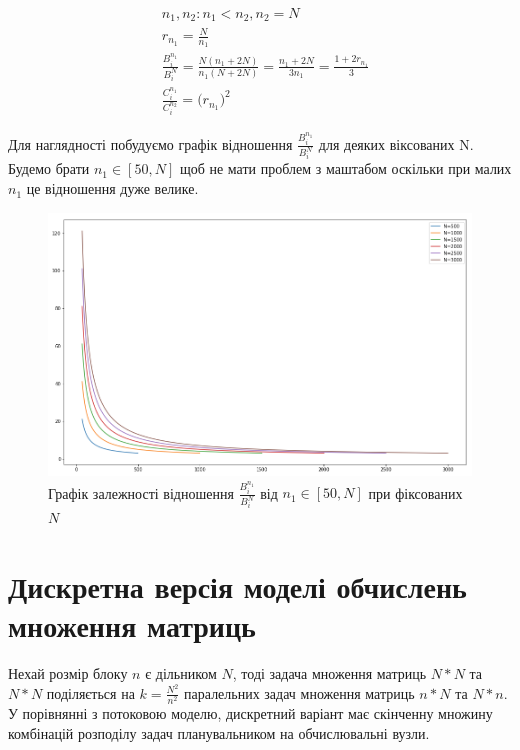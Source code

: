 \begin{equation}
\label{eq:diff_n1n2}
	\begin{aligned}
	& n_1, n_2 : n_1 < n_2, n_2 = N
	\\
	& r_{n_1} = \frac{N}{n_{1}}
	\\
	& \frac{B_i^{n_1}}{B_i^{N}} =\frac{ N ( n_1 + 2N ) }{n_1 ( N + 2N )} = \frac{n_1 + 2N}{3n_1} = \frac{1 + 2r_{n_1}}{3}
	\\
	& \frac{C_i^{n_1}}{C_i^{n_2}} = \bigg( r_{n_1} \bigg)^2
	\end{aligned}
\end{equation}

Для наглядності побудуємо графік відношення $\frac{B_i^{n_1}}{B_i^{N}}$ для деяких віксованих N. Будемо брати $n_1 \in [50, N]$ щоб не мати проблем з маштабом оскільки при малих $n_1$ це відношення дуже велике.

\begin{figure}[H]
	\centering
	\includegraphics[width=\textwidth]{theory/img/B_times_diff_N}
	\caption{Графік залежності відношення $\frac{B_i^{n_1}}{B_i^{N}}$ від $n_1 \in [50, N]$ при фіксованих $N$ }
	\label{fig:one_diff_N}
\end{figure}

\section{Дискретна версія моделі обчислень множення матриць}
Нехай розмір блоку $n$ є дільником $N$, тоді задача множення матриць $N*N$ та $N*N$ поділяється на $k = \frac{N^2}{n^2}$ паралельних задач множення матриць $n*N$ та $N*n$.
У порівнянні з потоковою моделю, дискретний варіант має скінченну множину комбінацій розподілу задач планувальником на обчислювальні вузли.

